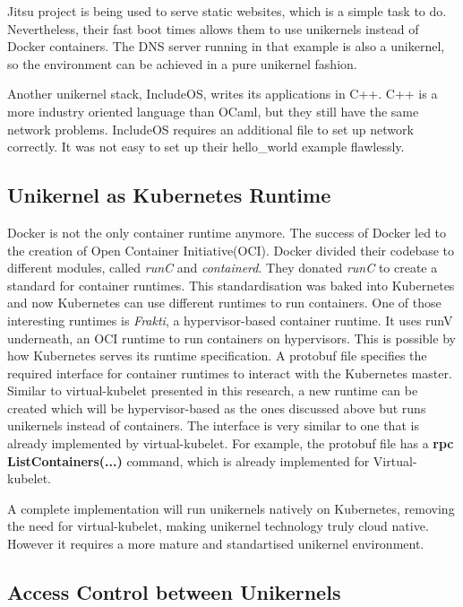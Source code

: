 Jitsu project is being used to serve static websites, which is a simple task to do. Nevertheless, their fast boot times allows them to use unikernels instead of Docker containers. The DNS server running in that example is also a unikernel, so the environment can be achieved in a pure unikernel fashion.

Another unikernel stack, IncludeOS, writes its applications in C++. C++ is a more industry oriented language than OCaml, but they still have the same network problems. IncludeOS requires an additional file to set up network correctly. It was not easy to set up their hello\_world example flawlessly.
\pagebreak
\subsection{Unikernel as Kubernetes Runtime}

Docker is not the only container runtime anymore. The success of Docker led to the creation of Open Container Initiative(OCI). Docker divided their codebase to different modules, called \textit{runC} and \textit{containerd}. They donated \textit{runC} to create a standard for container runtimes. This standardisation was baked into Kubernetes and now Kubernetes can use different runtimes to run containers. One of those interesting runtimes is \textit{Frakti}, a hypervisor-based container runtime. It uses runV underneath, an OCI runtime to run containers on hypervisors. This is possible by how Kubernetes serves its runtime specification. A protobuf file \cite{protobuf} specifies the required interface for container runtimes to interact with the Kubernetes master. Similar to virtual-kubelet presented in this research, a new runtime can be created which will be hypervisor-based as the ones discussed above but runs unikernels instead of containers. The interface is very similar to one that is already implemented by virtual-kubelet. For example, the protobuf file has a \textbf{rpc ListContainers(...)} command, which is already implemented for Virtual-kubelet.

A complete implementation will run unikernels natively on Kubernetes, removing the need for virtual-kubelet, making unikernel technology truly cloud native. However it requires a more mature and standartised unikernel environment.

\subsection{Access Control between Unikernels}

